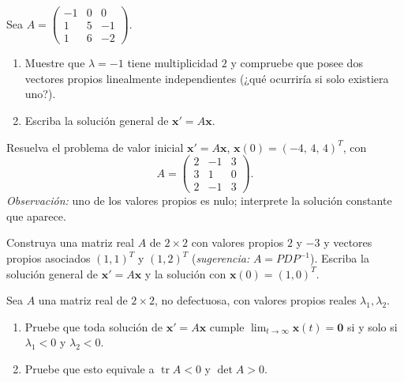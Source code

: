 \begin{exercise}[\est{3}]\label{ex:E8}
Sea $A = \begin{pmatrix} -1 & 0 & 0\\ 1 & 5 & -1\\ 1 & 6 & -2\end{pmatrix}$.
\begin{enumerate}[a]
    \item Muestre que $\lambda = -1$ tiene multiplicidad $2$ y compruebe que posee dos vectores propios linealmente independientes (¿qué ocurriría si solo existiera uno?).
    \item Escriba la solución general de $\mathbf{x}' = A\mathbf{x}$.
\end{enumerate}
\end{exercise}

\begin{exercise}[\est{3}]\label{ex:E9}
Resuelva el problema de valor inicial $\mathbf{x}' = A\mathbf{x}$, $\mathbf{x}(0) = (-4,\,4,\,4)^T$, con
\[
A = \begin{pmatrix} 2 & -1 & 3\\ 3 & 1 & 0\\ 2 & -1 & 3\end{pmatrix}.
\]
\emph{Observación:} uno de los valores propios es nulo; interprete la solución constante que aparece.
\end{exercise}

\begin{exercise}[\est{3}]\label{ex:E10}
Construya una matriz real $A$ de $2\times 2$ con valores propios $2$ y $-3$ y vectores propios asociados $(1,1)^T$ y $(1,2)^T$ (\emph{sugerencia:} $A = PDP^{-1}$). Escriba la solución general de $\mathbf{x}' = A\mathbf{x}$ y la solución con $\mathbf{x}(0) = (1,0)^T$.
\end{exercise}

\begin{exercise}[\est{3}]\label{ex:E11}
Sea $A$ una matriz real de $2\times2$, no defectuosa, con valores propios reales $\lambda_1,\lambda_2$.
\begin{enumerate}[a]
    \item Pruebe que toda solución de $\mathbf{x}' = A\mathbf{x}$ cumple $\lim_{t\to\infty}\mathbf{x}(t) = \mathbf{0}$ si y solo si $\lambda_1 < 0$ y $\lambda_2 < 0$.
    \item Pruebe que esto equivale a $\operatorname{tr}A < 0$ y $\det A > 0$.
\end{enumerate}
\end{exercise}

